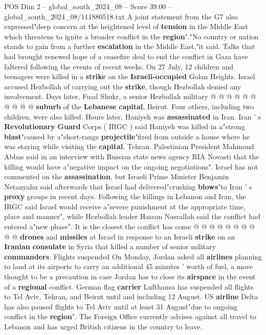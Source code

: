 \begin{textsample}{POS Dim 2 – global\_south\_2024\_08 – Score 39.00 – global\_south\_2024\_08/111880518.txt}
A joint statement from the G7 also expressed"deep concern at the heightened level of \textbf{tension} in the Middle East which threatens to ignite a broader conflict in the \textbf{region}"."No country or nation stands to gain from a further \textbf{escalation} in the Middle East,"it said.
Talks that had brought renewed hope of a ceasefire deal to end the conflict in Gaza have faltered following the events of recent weeks.
On 27 July, 12 children and teenagers were killed in a \textbf{strike} on the \textbf{Israeli-occupied} Golan Heights.
Israel accused Hezbollah of carrying out the \textbf{strike}, though Hezbollah denied any involvement.
Days later, Fuad Shukr, a senior Hezbollah military @ @ @ @ @ @ @ @ @ @ \textbf{suburb} of the \textbf{Lebanese} \textbf{capital}, Beirut.
Four others, including two children, were also killed.
Hours later, Haniyeh was \textbf{assassinated} in Iran.
Iran ' s \textbf{Revolutionary} \textbf{Guard} Corps ( IRGC ) said Haniyeh was killed in a"strong \textbf{blast}"caused by a"short-range \textbf{projectile}"fired from outside a house where he was staying while visiting the \textbf{capital}, Tehran.
Palestinian President Mahmoud Abbas said in an interview with Russian state news agency RIA Novosti that the killing would have a"negative impact on the ongoing negotiations".
Israel has not commented on the \textbf{assassination}, but Israeli Prime Minister Benjamin Netanyahu said afterwards that Israel had delivered"crushing \textbf{blows}"to Iran ' s \textbf{proxy} groups in recent days.
Following the killings in Lebanon and Iran, the IRGC said Israel would receive a"severe punishment at the appropriate time, place and manner", while Hezbollah leader Hassan Nasrallah said the conflict had entered a"new phase".
It is the closest the conflict has come @ @ @ @ @ @ @ @ @ @ \textbf{drones} and \textbf{missiles} at Israel in response to an Israeli \textbf{strike} on an \textbf{Iranian} \textbf{consulate} in Syria that killed a number of senior military \textbf{commanders}.
Flights suspended On Monday, Jordan asked all \textbf{airlines} planning to land at its airports to carry an additional 45 minutes ' worth of fuel, a move thought to be a precaution in case Jordan has to close its \textbf{airspace} in the event of a \textbf{regional} conflict.
German flag \textbf{carrier} Lufthansa has suspended all flights to Tel Aviv, Tehran, and Beirut until and including 12 August.
US \textbf{airline} Delta has also paused flights to Tel Aviv until at least 31 August"due to ongoing conflict in the \textbf{region}".
The Foreign Office currently advises against all travel to Lebanon and has urged British citizens in the country to leave.

\end{textsample}
